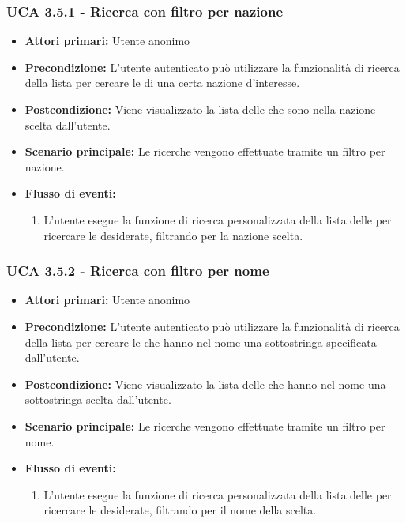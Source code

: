 \subsubsection{UCA 3.5.1 - Ricerca con filtro per nazione}%
\begin{itemize}
	\item \textbf{Attori primari:} Utente anonimo
	\item \textbf{Precondizione:} L'utente autenticato può utilizzare la funzionalità di ricerca della lista per cercare le  di una certa nazione d'interesse.
	\item \textbf{Postcondizione:} Viene visualizzato la lista delle  che sono nella nazione scelta dall'utente.
	\item \textbf{Scenario principale:} Le ricerche vengono effettuate tramite un filtro per nazione.
	\item \textbf{Flusso di eventi:}
	\begin{enumerate}
		\item L'utente esegue la funzione di ricerca personalizzata della lista delle  per ricercare le  desiderate, filtrando per la nazione scelta.
	\end{enumerate}
\end{itemize}

\subsubsection{UCA 3.5.2 - Ricerca con filtro per nome}%
\begin{itemize}
	\item \textbf{Attori primari:} Utente anonimo
	\item \textbf{Precondizione:} L'utente autenticato può utilizzare la funzionalità di ricerca della lista per cercare le  che hanno nel nome una sottostringa specificata dall'utente.
	\item \textbf{Postcondizione:} Viene visualizzato la lista delle  che hanno nel nome una sottostringa scelta dall'utente.
	\item \textbf{Scenario principale:} Le ricerche vengono effettuate tramite un filtro per nome.
	\item \textbf{Flusso di eventi:}
	\begin{enumerate}
		\item L'utente esegue la funzione di ricerca personalizzata della lista delle  per ricercare le  desiderate, filtrando per il nome della  scelta.
	\end{enumerate}
\end{itemize}

